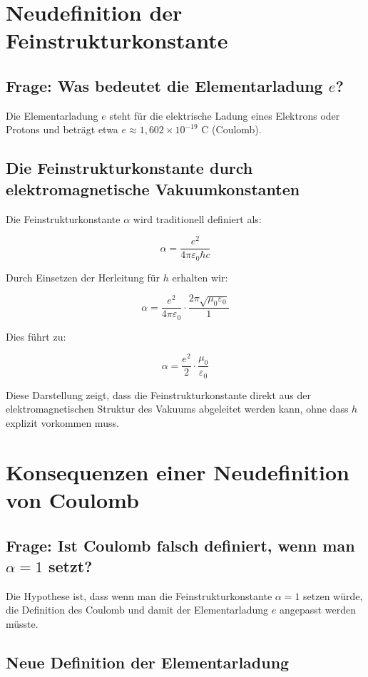 \documentclass{article}
\begin{document}
	\section{Neudefinition der Feinstrukturkonstante}
	
	\subsection{Frage: Was bedeutet die Elementarladung $e$?}
	
	Die Elementarladung $e$ steht für die elektrische Ladung eines Elektrons oder Protons und beträgt etwa $e \approx 1,602 \times 10^{-19}$ C (Coulomb).
	
	\subsection{Die Feinstrukturkonstante durch elektromagnetische Vakuumkonstanten}
	
	Die Feinstrukturkonstante $\alpha$ wird traditionell definiert als:
	
	$$\alpha = \frac{e^2}{4\pi\varepsilon_0\hbar c}$$
	
	Durch Einsetzen der Herleitung für $h$ erhalten wir:
	
	$$\alpha = \frac{e^2}{4\pi\varepsilon_0} \cdot \frac{2\pi\sqrt{\mu_0\varepsilon_0}}{1}$$
	
	Dies führt zu:
	
	$$\alpha = \frac{e^2}{2} \cdot \frac{\mu_0}{\varepsilon_0}$$
	
	Diese Darstellung zeigt, dass die Feinstrukturkonstante direkt aus der elektromagnetischen Struktur des Vakuums abgeleitet werden kann, ohne dass $h$ explizit vorkommen muss.
	
	\section{Konsequenzen einer Neudefinition von Coulomb}
	
	\subsection{Frage: Ist Coulomb falsch definiert, wenn man $\alpha = 1$ setzt?}
	
	Die Hypothese ist, dass wenn man die Feinstrukturkonstante $\alpha = 1$ setzen würde, die Definition des Coulomb und damit der Elementarladung $e$ angepasst werden müsste.
	
	\subsection{Neue Definition der Elementarladung}
	
\end{document}
